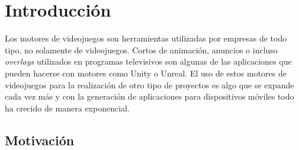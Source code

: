 %
%
%
%
%
%
%
%
%
%

\chapter{Introducci\'on}

Los motores de videojuegos son herramientas utilizadas por empresas de todo tipo, no solamente de videojuegos. Cortos de animaci\'on, anuncios o incluso \textit{overlays} utilizados en programas televisivos son algunas de las aplicaciones que pueden hacerse con motores como Unity o Unreal. El uso de estos motores de videojuegos para la realizaci\'on de otro tipo de proyectos es algo que se expande cada vez m\'as y con la generaci\'on de aplicaciones para dispositivos m\'oviles todo ha crecido de manera exponencial.

\section{Motivaci\'on}
\label{cap1:sec:introduccion}

